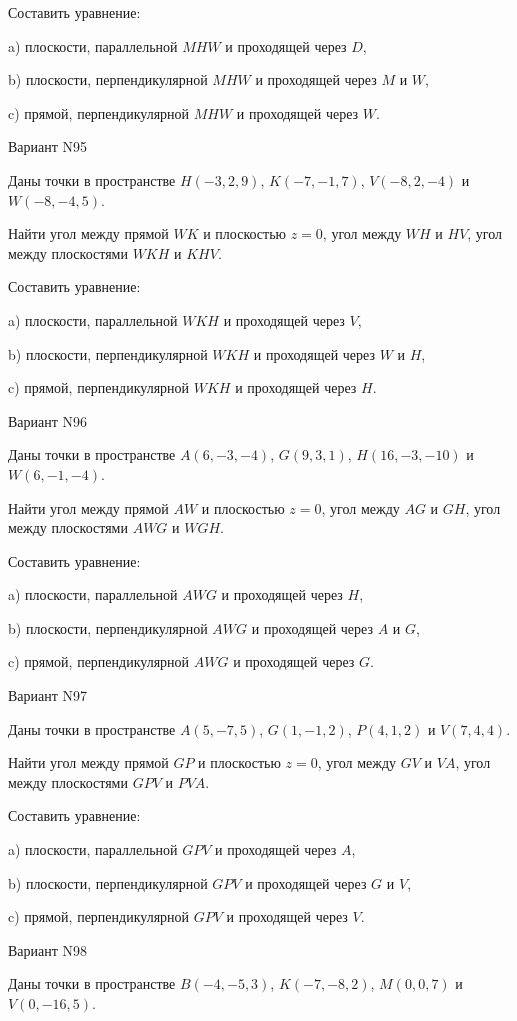 \documentclass[11pt]{report}
\begin{document}
Составить уравнение: 

a) плоскости, параллельной $MHW$ и проходящей через $D$,

b) плоскости, перпендикулярной $MHW$ и проходящей через $M$ и $W$,

c) прямой, перпендикулярной $MHW$ и проходящей через $W$.

Вариант N95

Даны точки в пространстве
$H(-3, 2, 9)$, $K(-7, -1, 7)$, $V(-8, 2, -4)$ и
$W(-8, -4, 5)$.

Найти угол между прямой $WK$ и плоскостью $z = 0$, угол между $WH$ и $HV$, угол между плоскостями $WKH$ 
и $KHV$.

Составить уравнение: 

a) плоскости, параллельной $WKH$ и проходящей через $V$,

b) плоскости, перпендикулярной $WKH$ и проходящей через $W$ и $H$,

c) прямой, перпендикулярной $WKH$ и проходящей через $H$.

Вариант N96

Даны точки в пространстве
$A(6, -3, -4)$, $G(9, 3, 1)$, $H(16, -3, -10)$ и
$W(6, -1, -4)$.

Найти угол между прямой $AW$ и плоскостью $z = 0$, угол между $AG$ и $GH$, угол между плоскостями $AWG$ 
и $WGH$.

Составить уравнение: 

a) плоскости, параллельной $AWG$ и проходящей через $H$,

b) плоскости, перпендикулярной $AWG$ и проходящей через $A$ и $G$,

c) прямой, перпендикулярной $AWG$ и проходящей через $G$.

Вариант N97

Даны точки в пространстве
$A(5, -7, 5)$, $G(1, -1, 2)$, $P(4, 1, 2)$ и
$V(7, 4, 4)$.

Найти угол между прямой $GP$ и плоскостью $z = 0$, угол между $GV$ и $VA$, угол между плоскостями $GPV$ 
и $PVA$.

Составить уравнение: 

a) плоскости, параллельной $GPV$ и проходящей через $A$,

b) плоскости, перпендикулярной $GPV$ и проходящей через $G$ и $V$,

c) прямой, перпендикулярной $GPV$ и проходящей через $V$.

Вариант N98

Даны точки в пространстве
$B(-4, -5, 3)$, $K(-7, -8, 2)$, $M(0, 0, 7)$ и
$V(0, -16, 5)$.
\end{document}
